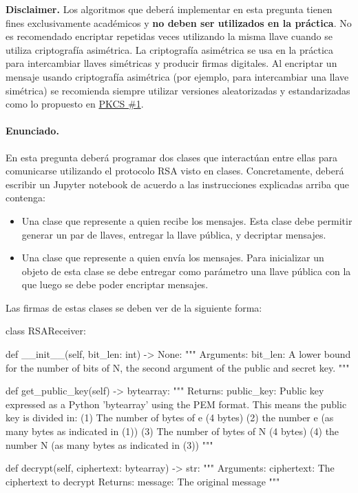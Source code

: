 

\textbf{Disclaimer.} Los algoritmos que deberá implementar en esta pregunta tienen fines exclusivamente académicos y \textbf{no deben ser utilizados en la práctica}. No es recomendado encriptar repetidas veces utilizando la misma llave cuando se utiliza criptografía asimétrica. La criptografía asimétrica se usa en la práctica para intercambiar llaves simétricas y producir firmas digitales. Al encriptar un mensaje usando criptografía asimétrica (por ejemplo, para intercambiar una llave simétrica) se recomienda siempre utilizar versiones aleatorizadas y estandarizadas como lo propuesto en \href{https://en.wikipedia.org/wiki/PKCS_1}{PKCS \#1}.

\paragraph{Enunciado.} En esta pregunta deberá programar dos clases que interactúan entre ellas para comunicarse utilizando el protocolo RSA visto en clases. Concretamente, deberá escribir un Jupyter notebook de acuerdo a las instrucciones explicadas arriba que contenga:

\begin{itemize}
  \item Una clase que represente a quien recibe los mensajes. Esta clase debe permitir generar un par de llaves, entregar la llave pública, y decriptar mensajes.
  \item Una clase que represente a quien envía los mensajes. Para inicializar un objeto de esta clase se debe entregar como parámetro una llave pública con la que luego se debe poder encriptar mensajes.
\end{itemize}

Las firmas de estas clases se deben ver de la siguiente forma:

\begin{python}
  class RSAReceiver:
    
    def __init__(self, bit_len: int) -> None:
    """
    Arguments:
      bit_len: A lower bound for the number of bits of N,
               the second argument of the public and secret key.
    """

    def get_public_key(self) -> bytearray:
    """
    Returns:
      public_key: Public key expressed as a Python 'bytearray' using the
                  PEM format. This means the public key is divided in:
                  (1) The number of bytes of e (4 bytes)
                  (2) the number e (as many bytes as indicated in (1))
                  (3) The number of bytes of N (4 bytes)
                  (4) the number N (as many bytes as indicated in (3))
    """

    def decrypt(self, ciphertext: bytearray) -> str:
    """
    Arguments:
      ciphertext: The ciphertext to decrypt
    Returns:
      message: The original message
    """
\end{python}

